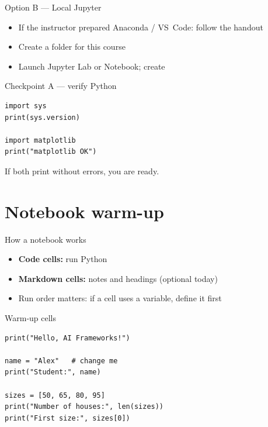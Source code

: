 \documentclass[aspectratio=169,11pt]{beamer}
\begin{document}
    \begin{frame}{Option B --- Local Jupyter}
        \begin{itemize}
            \item If the instructor prepared Anaconda / VS~Code: follow the handout
            \item Create a folder for this course
            \item Launch Jupyter Lab or Notebook; create 
        \end{itemize}
        \vspace{0.5em}
    \end{frame}

    \begin{frame}[fragile]{Checkpoint A --- verify Python}
        \begin{lstlisting}
import sys
print(sys.version)

import matplotlib
print("matplotlib OK")
        \end{lstlisting}
        \vspace{0.3em}
        If both print without errors, you are ready.
    \end{frame}

    \section{Notebook warm-up}

    \begin{frame}{How a notebook works}
        \begin{itemize}
            \item \textbf{Code cells:} run Python
            \item \textbf{Markdown cells:} notes and headings (optional today)
            \item Run order matters: if a cell uses a variable, define it first
        \end{itemize}
        \vspace{0.5em}
    \end{frame}

    \begin{frame}[fragile]{Warm-up cells}
        \begin{lstlisting}
print("Hello, AI Frameworks!")

name = "Alex"   # change me
print("Student:", name)

sizes = [50, 65, 80, 95]
print("Number of houses:", len(sizes))
print("First size:", sizes[0])
        \end{lstlisting}
    \end{frame}
\end{document}
